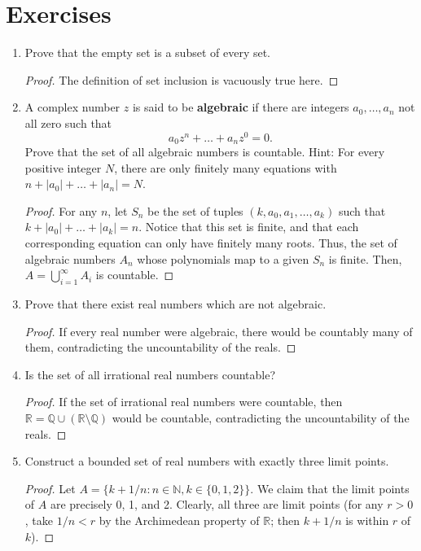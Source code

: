 \documentclass{scrbook}
\newcommand{\N}{\mathbb{N}}
\newcommand{\Q}{\mathbb{Q}}
\newcommand{\R}{\mathbb{R}}
\begin{document}
\section{Exercises}
\begin{enumerate}
\item %
Prove that the empty set is a subset of every set.

\begin{proof}
The definition of set inclusion is vacuously true here.
\end{proof}

\item %
A complex number $z$ is said to be \textbf{algebraic} if there are integers $a_0, \dotsc, a_n$ not all zero such that
\[
	a_0z^n + \dotsc + a_nz^0 = 0.
\]
Prove that the set of all algebraic numbers is countable. Hint: For every positive integer $N$, there are only finitely many equations with $n + |a_0| + \dotsc + |a_n| = N$.

\begin{proof}
For any $n$, let $S_n$ be the set of tuples $(k, a_0, a_1, \dotsc, a_k)$ such that $k + |a_0| + \dotsc + |a_k| = n$. Notice that this set is finite, and that each corresponding equation can only have finitely many roots. Thus, the set of algebraic numbers $A_n$ whose polynomials map to a given $S_n$ is finite. Then, $A = \bigcup_{i=1}^{\infty} A_i$ is countable.
\end{proof}

\item %
Prove that there exist real numbers which are not algebraic.

\begin{proof}
If every real number were algebraic, there would be countably many of them, contradicting the uncountability of the reals.
\end{proof}

\item %
Is the set of all irrational real numbers countable?

\begin{proof}
If the set of irrational real numbers were countable, then $\R = \Q \cup (\R \setminus \Q)$ would be countable, contradicting the uncountability of the reals.
\end{proof}

\item %
Construct a bounded set of real numbers with exactly three limit points.

\begin{proof}
Let $A = \{k + 1/n : n \in \N, k \in \{0, 1, 2\}\}$. We claim that the limit points of $A$ are precisely 0, 1, and 2. Clearly, all three are limit points (for any $r > 0$, take $1/n < r$ by the Archimedean property of $\R$; then $k + 1/n$ is within $r$ of $k$).


\end{proof}
\end{enumerate}
\end{document}
